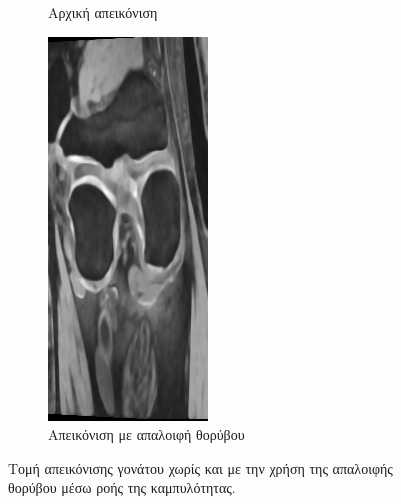 \documentclass[a4paper,12pt]{article}
\begin{document}
\begin{figure}[H]
\begin{subfigure}[t]{0.4\linewidth}
    \caption{Αρχική απεικόνιση}
    \end{subfigure}
    \begin{subfigure}[t]{0.4\linewidth}
    \includegraphics[width=\linewidth]{curvature_2.png}
    \caption{Απεικόνιση με απαλοιφή θορύβου}
    \end{subfigure}

    \caption{Τομή απεικόνισης γονάτου χωρίς και με την χρήση της απαλοιφής
    θορύβου μέσω ροής της καμπυλότητας.}
    \label{fig:curvature_flow:2}
\end{figure}
\end{document}
